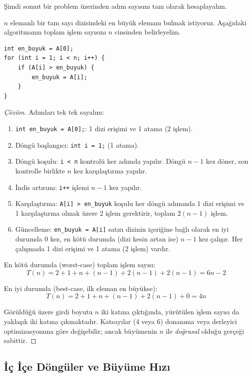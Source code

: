 Şimdi somut bir problem üzerinden adım sayısını tam olarak hesaplayalım.

\begin{example}
$n$ elemanlı bir tam sayı dizisindeki en büyük elemanı bulmak istiyoruz. Aşağıdaki algoritmanın toplam işlem sayısını $n$ cinsinden belirleyelim.

\begin{lstlisting}[language=CTemel]
int en_buyuk = A[0];
for (int i = 1; i < n; i++) {
    if (A[i] > en_buyuk) {
        en_buyuk = A[i];
    }
}
\end{lstlisting}
\end{example}

\begin{proof}[Çözüm]
Adımları tek tek sayalım:
\begin{enumerate}
    \item \texttt{int en\_buyuk = A[0];}: 1 dizi erişimi ve 1 atama (2 işlem).
    \item Döngü başlangıcı: \texttt{int i = 1;} (1 atama).
    \item Döngü koşulu: \texttt{i < n} kontrolü her adımda yapılır. Döngü $n-1$ kez döner, son kontrolle birlikte $n$ kez karşılaştırma yapılır.
    \item İndis artırımı: \texttt{i++} işlemi $n-1$ kez yapılır.
    \item Karşılaştırma: \texttt{A[i] > en\_buyuk} koşulu her döngü adımında 1 dizi erişimi ve 1 karşılaştırma olmak üzere 2 işlem gerektirir, toplam $2(n-1)$ işlem.
    \item Güncelleme: \texttt{en\_buyuk = A[i]} satırı dizinin içeriğine bağlı olarak en iyi durumda 0 kez, en kötü durumda (dizi kesin artan ise) $n-1$ kez çalışır. Her çalışmada 1 dizi erişimi ve 1 atama (2 işlem) vardır.
\end{enumerate}

En kötü durumda (worst-case) toplam işlem sayısı:
\[ T(n) = 2 + 1 + n + (n-1) + 2(n-1) + 2(n-1) = 6n - 2 \]

En iyi durumda (best-case, ilk eleman en büyükse):
\[ T(n) = 2 + 1 + n + (n-1) + 2(n-1) + 0 = 4n \]

Görüldüğü üzere girdi boyutu $n$ iki katına çıktığında, yürütülen işlem sayısı da yaklaşık iki katına çıkmaktadır. Katsayılar (4 veya 6) donanıma veya derleyici optimizasyonuna göre değişebilir; ancak büyümenin $n$ ile \emph{doğrusal} olduğu gerçeği sabittir.
\end{proof}

\subsection{İç İçe Döngüler ve Büyüme Hızı}

